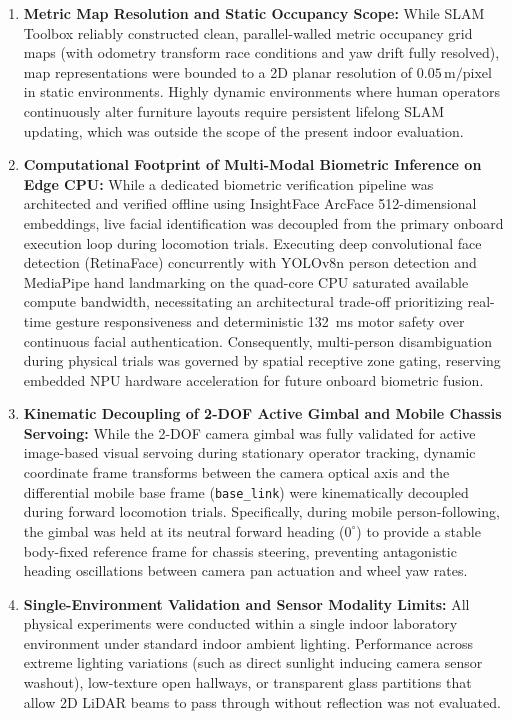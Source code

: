 \begin{enumerate}
    \item \textbf{Metric Map Resolution and Static Occupancy Scope:} While SLAM Toolbox reliably constructed clean, parallel-walled metric occupancy grid maps (with odometry transform race conditions and yaw drift fully resolved), map representations were bounded to a 2D planar resolution of $0.05\,\text{m/pixel}$ in static environments. Highly dynamic environments where human operators continuously alter furniture layouts require persistent lifelong SLAM updating, which was outside the scope of the present indoor evaluation.
    \item \textbf{Computational Footprint of Multi-Modal Biometric Inference on Edge CPU:} While a dedicated biometric verification pipeline was architected and verified offline using InsightFace ArcFace 512-dimensional embeddings, live facial identification was decoupled from the primary onboard execution loop during locomotion trials. Executing deep convolutional face detection (RetinaFace) concurrently with YOLOv8n person detection and MediaPipe hand landmarking on the quad-core CPU saturated available compute bandwidth, necessitating an architectural trade-off prioritizing real-time gesture responsiveness and deterministic 132~ms motor safety over continuous facial authentication. Consequently, multi-person disambiguation during physical trials was governed by spatial receptive zone gating, reserving embedded NPU hardware acceleration for future onboard biometric fusion.
    \item \textbf{Kinematic Decoupling of 2-DOF Active Gimbal and Mobile Chassis Servoing:} While the 2-DOF camera gimbal was fully validated for active image-based visual servoing during stationary operator tracking, dynamic coordinate frame transforms between the camera optical axis and the differential mobile base frame (\texttt{base\_link}) were kinematically decoupled during forward locomotion trials. Specifically, during mobile person-following, the gimbal was held at its neutral forward heading ($0^\circ$) to provide a stable body-fixed reference frame for chassis steering, preventing antagonistic heading oscillations between camera pan actuation and wheel yaw rates.
    \item \textbf{Single-Environment Validation and Sensor Modality Limits:} All physical experiments were conducted within a single indoor laboratory environment under standard indoor ambient lighting. Performance across extreme lighting variations (such as direct sunlight inducing camera sensor washout), low-texture open hallways, or transparent glass partitions that allow 2D LiDAR beams to pass through without reflection was not evaluated.
\end{enumerate}

